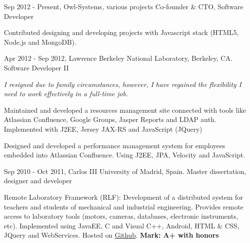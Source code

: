 
\experience
  {Sep 2012 - Present, Owl-Systems, various projects}
  {Co-founder \& CTO, Software Developer}
  {\vspace{-1em}\begin{rlist}
    \item
    \item Contributed designing and developing projects with Javascript stack (HTML5, Node.js and MongoDB).
  \end{rlist}}

\experience
  {Apr 2012 - Sep 2012, Lawrence Berkeley National Laboratory, Berkeley, CA.}
  {Software Developer II}
  {\emph{I resigned due to family circumstances, however, I have
    regained the flexibility I need to work effectively in a full-time
    job.}
    \begin{rlist}
    \item Maintained and developed a resources management site
    connected with tools like Atlassian Confluence, Google Groups, Jasper
    Reports and LDAP auth. Implemented with J2EE, Jersey JAX-RS and
    JavaScript (JQuery)
    \item Designed and developed a performance management system for
    employees embedded into Atlassian Confluence. Using J2EE, JPA,
    Velocity and JavaScript.
  \end{rlist}}

\experience
  {Sep 2010 - Oct 2011, Carlos III University of Madrid, Spain.}
  {Master dissertation, designer and developer}
  {\vspace{-1em}\begin{rlist}
    \item Remote Laboratory Framework (RLF): Development of a distributed
    system for teachers and students of mechanical and industrial
    engineering. Provides remote access to laboratory tools (motors,
    cameras, databases, electronic instruments, etc).
    Implemented using JavaEE, C and Visual C++,
    Android, HTML \& CSS, JQuery and WebServices. Hosted on \href{https://github.com/CarlosMecha/remote-laboratory-framework}{Github}.
    \textbf{Mark: A+ with honors}
  \end{rlist}}

